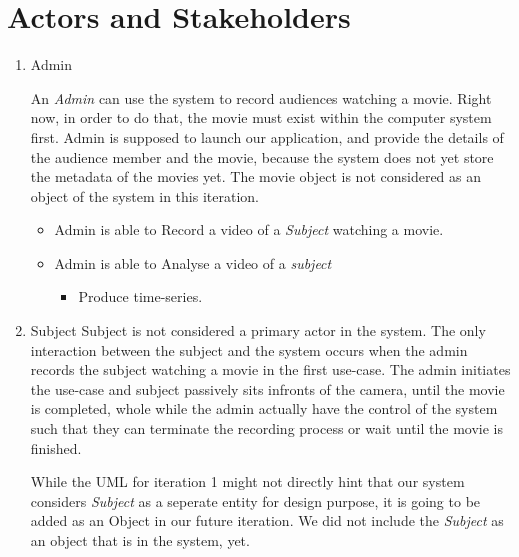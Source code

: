 \documentclass[12pt,a4paper,man]{report}
\begin{document}
\section{Actors and Stakeholders}
\label{sec:orgf8c9d0a}
\begin{enumerate}
\item Admin
\label{sec:org57f4430}

An \emph{Admin} can use the system to record audiences watching a movie. Right now, in order to do that, the movie must exist within the computer system first. Admin is supposed to launch our application, and provide the details of the audience member and the movie, because the system does not yet store the metadata of the movies yet. The movie object is not considered as an object of the system in this iteration.

\begin{itemize}
\item Admin is able to Record a video of a \emph{Subject} watching a movie.
\item Admin is able to Analyse a video of a \emph{subject}
\begin{itemize}
\item Produce time-series.
\end{itemize}
\end{itemize}

\item Subject
\label{sec:orgeabc669}
Subject is not considered a primary actor in the system. The only interaction between the subject and the system occurs when the admin records the subject watching a movie in the first use-case. The admin initiates the use-case and subject passively sits infronts of the camera, until the movie is completed, whole while the admin actually have the control of the system such that they can terminate the recording process or wait until the movie is finished.

While the UML for iteration 1 might not directly hint that our system considers \emph{Subject} as a seperate entity for design purpose, it is going to be added as an Object in our future iteration. We did not include the \emph{Subject} as an object that is in the system, yet.
\end{enumerate}
\end{document}
